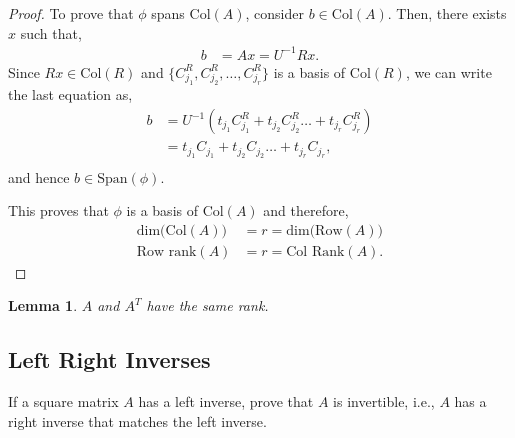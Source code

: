 \documentclass{amsart}
\theoremstyle{plain}
\newtheorem{lemma}{Lemma}
\numberwithin{equation}{section}
\begin{document}
\begin{proof}
To prove that $\phi$ spans $\mathrm{Col}(A)$, consider $b \in \mathrm{Col}(A)$.  
Then, there exists $x$ such that,
\begin{align*}
b &= A x = U^{-1}Rx.
\end{align*}
Since $Rx \in \mathrm{Col}(R)$ and $\{C^{R}_{j_1}, C^{R}_{j_2}, \ldots, C^{R}_{j_r}\}$ 
is a basis of $\mathrm{Col}(R)$, we can write the last equation as,
\begin{align*}
b &= U^{-1} (t_{j_1} C^{R}_{j_1} + t_{j_2} C^{R}_{j_2}  \ldots + t_{j_r} C^{R}_{j_r})\\
&= t_{j_1} C_{j_1} + t_{j_2} C_{j_2}  \ldots + t_{j_r} C_{j_r},\\
\end{align*}
and hence $b \in \mathrm{Span}(\phi)$. 

This proves that $\phi$ is a basis of $\mathrm{Col}(A)$ and therefore,
\begin{align*}
\mathrm{dim(Col}(A))&=r=\mathrm{dim(Row}(A))\\
\textrm{Row rank}(A)&=r=\textrm{Col Rank}(A).
\end{align*}

\end{proof}

\begin{lemma}
$A$ and $A^T$ have the same rank.
\end{lemma}

\subsection{Left Right Inverses}
If a square matrix $A$ has a left inverse,
prove that $A$ is invertible, i.e., $A$ has a right 
inverse that matches the left inverse.  
\end{document}
